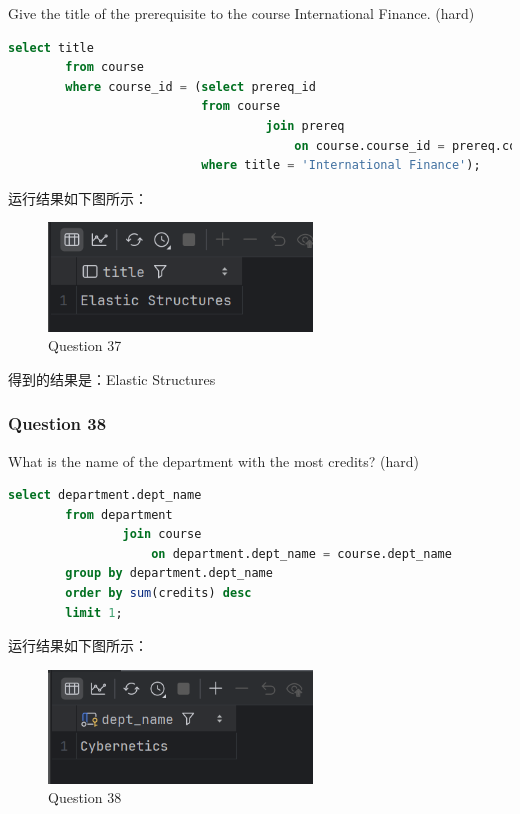 \documentclass{article}
\begin{document}
    Give the title of the prerequisite to the course International Finance.  (hard)
    
    \begin{lstlisting}[language=sql, title=Question 37, tabsize=4]
    	select title
    	from course
    	where course_id = (select prereq_id
    					   from course
    								join prereq
    									on course.course_id = prereq.course_id
    					   where title = 'International Finance');
    \end{lstlisting}
    
    运行结果如下图所示：
    
    \begin{figure}[H]
    	\centering
    	\includegraphics[width=7cm]{./images/42.Question37.png}
    	\caption{Question 37}
    \end{figure}
    
    得到的结果是：Elastic Structures
    
    \subsubsection{Question 38}
    
    What is the name of the department with the most credits?  (hard)
    
    \begin{lstlisting}[language=sql, title=Question 38, tabsize=4]
    	select department.dept_name
    	from department 
    			join course
    				on department.dept_name = course.dept_name
    	group by department.dept_name
    	order by sum(credits) desc
    	limit 1;
    \end{lstlisting}
    
    运行结果如下图所示：
    
    \begin{figure}[H]
    	\centering
    	\includegraphics[width=7cm]{./images/43.Question38.png}
    	\caption{Question 38}
    \end{figure}
    
\end{document}
